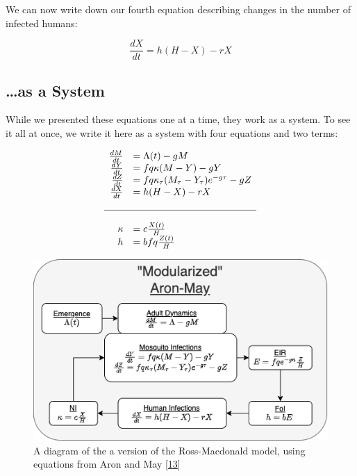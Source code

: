 \documentclass[
]{book}
\begin{document}
We can now write down our fourth equation describing changes in the number of infected humans:

\begin{equation}
\frac{dX}{dt} = h (H-X) - r X 
\end{equation}

\hypertarget{as-a-system}{%
\subsection{\ldots as a System}\label{as-a-system}}

While we presented these equations one at a time, they work as a system. To see it all at once, we write it here as a system with four equations and two terms:

\begin{equation}
\begin{array}{rl}
\frac{dM}{dt} &= \Lambda(t) - g M \\
\frac{dY}{dt} &= fq\kappa(M-Y) - g Y \\
\frac{dZ}{dt} &= fq\kappa_\tau(M_\tau-Y_\tau)e^{-g\tau} - g Z \\
\frac{dX}{dt} &= h (H-X) - rX  \\ \\ \hline \\ 
\kappa &= c \frac{X(t)}{H} \\
h &= b fq \frac{Z(t)}{H} \\
\end{array}
\end{equation}

\begin{figure}
\centering
\includegraphics{Figures/AronMay.png}
\caption{A diagram of the a version of the Ross-Macdonald model, using equations from Aron and May {[}\protect\hyperlink{ref-AronJL1982PopulationDynamics}{13}{]}}
\end{figure}
\end{document}
